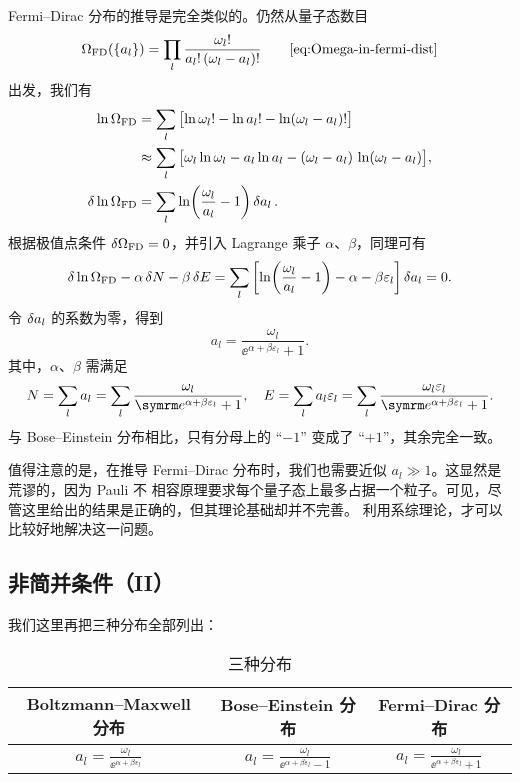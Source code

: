 Fermi--Dirac 分布的推导是完全类似的。仍然从量子态数目
\begin{equation}
  \Omega_\text{FD}(\qty{a_l}) = \prod_l \frac{\omega_l!}{a_l! \, \qty(\omega_l-a_l)!}
  \tag*{\eqref{eq:Omega-in-fermi-dist}}
\end{equation}
出发，我们有
\begin{align}
  \ln\Omega_\text{FD}
  &=       \sum_l \qty\big[\ln\omega_l! - \ln a_l! - \ln(\omega_l-a_l)!] \notag \\
  &\approx \sum_l \qty\big[\omega_l\ln\omega_l - a_l\ln a_l
                           - (\omega_l-a_l) \, \ln(\omega_l-a_l)], \\
  \var{\ln\Omega_\text{FD}}
  &= \sum_l \ln(\frac{\omega_l}{a_l}-1) \var{a_l}.
\end{align}
根据极值点条件 $\var{\Omega_\text{FD}}=0$，并引入 Lagrange 乘子 $\alpha$、$\beta$，同理可有
\begin{equation}
  \var{\ln\Omega_\text{FD}} - \alpha\var{N} - \beta\var{E}
  = \sum_l \qty[\ln(\frac{\omega_l}{a_l}-1) - \alpha - \beta\varepsilon_l] \var{a_l} = 0.
\end{equation}
令 $\var{a_l}$ 的系数为零，得到 
\begin{equation}
  a_l = \frac{\omega_l}{\ee^{\alpha+\beta\varepsilon_l}+1}.
\end{equation}
其中，$\alpha$、$\beta$ 需满足
\begin{equation}
  N = \sum_l a_l = \sum_l \frac{\omega_l}{\ee^{\alpha+\beta\varepsilon_l}+1} \qc
  E = \sum_l a_l \varepsilon_l = \sum_l \frac{\omega_l\varepsilon_l}%
                                        {\ee^{\alpha+\beta\varepsilon_l}+1}.
\end{equation}
与 Bose--Einstein 分布相比，只有分母上的 “$-1$” 变成了 “$+1$”，其余完全一致。

值得注意的是，在推导 Fermi--Dirac 分布时，我们也需要近似 $a_l \gg 1$。这显然是荒谬的，因为 Pauli 不
相容原理要求每个量子态上最多占据一个粒子。可见，尽管这里给出的结果是正确的，但其理论基础却并不完善。
利用系综理论，才可以比较好地解决这一问题。

\subsection{非简并条件（II）}

我们这里再把三种分布全部列出：

\begin{table}[ht]
  \centering
  \caption{三种分布}
  \begin{tabular}{ccc}
    \toprule
      Boltzmann--Maxwell 分布 & Bose--Einstein 分布 & Fermi--Dirac 分布 \\
    \midrule \addlinespace[1.2ex]
      $\displaystyle a_l = \frac{\omega_l}{\ee^{\alpha+\beta\varepsilon_l}}$   &
      $\displaystyle a_l = \frac{\omega_l}{\ee^{\alpha+\beta\varepsilon_l}-1}$ &
      $\displaystyle a_l = \frac{\omega_l}{\ee^{\alpha+\beta\varepsilon_l}+1}$ \\[1.5ex]
    \bottomrule
  \end{tabular}
\end{table}

